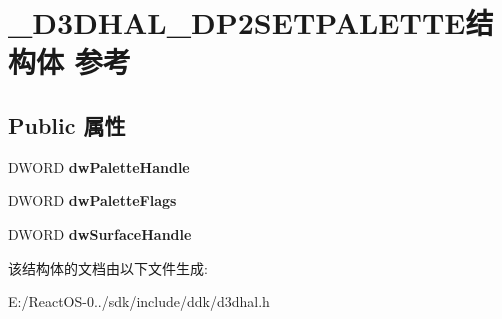 \hypertarget{struct___d3_d_h_a_l___d_p2_s_e_t_p_a_l_e_t_t_e}{}\section{\+\_\+\+D3\+D\+H\+A\+L\+\_\+\+D\+P2\+S\+E\+T\+P\+A\+L\+E\+T\+T\+E结构体 参考}
\label{struct___d3_d_h_a_l___d_p2_s_e_t_p_a_l_e_t_t_e}
\subsection*{Public 属性}
\begin{DoxyCompactItemize}
\item 
\mbox{\label{struct___d3_d_h_a_l___d_p2_s_e_t_p_a_l_e_t_t_e_a3fd1a0ec2beb501150e18fdf6f65378a}} 
D\+W\+O\+RD {\bfseries dw\+Palette\+Handle}
\item 
\mbox{\label{struct___d3_d_h_a_l___d_p2_s_e_t_p_a_l_e_t_t_e_ab548316e785437a50a06f01c469fc202}} 
D\+W\+O\+RD {\bfseries dw\+Palette\+Flags}
\item 
\mbox{\label{struct___d3_d_h_a_l___d_p2_s_e_t_p_a_l_e_t_t_e_aac482f28daf85792bfdde5d438321b1f}} 
D\+W\+O\+RD {\bfseries dw\+Surface\+Handle}
\end{DoxyCompactItemize}


该结构体的文档由以下文件生成\+:\begin{DoxyCompactItemize}
\item 
E\+:/\+React\+O\+S-\/0../sdk/include/ddk/d3dhal.\+h\end{DoxyCompactItemize}
